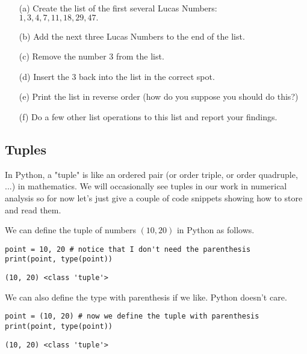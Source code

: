 \begin{problem}
    \begin{enumerate}
        \item[(a)] Create the list of the first several Lucas Numbers: \\
            $1,3,4,7,11,18,29,47.$
        \item[(b)] Add the next three Lucas Numbers to the end of the list.
        \item[(c)] Remove the number 3 from the list.
        \item[(d)] Insert the 3 back into the list in the correct spot.
        \item[(e)] Print the list in reverse order (how do you suppose you should do this?)
        \item[(f)] Do a few other list operations to this list and report your findings.
    \end{enumerate}
\end{problem}

\subsection{Tuples}
In Python, a "tuple" is like an ordered pair (or order triple, or order quadruple, ...) in
mathematics.  We will occasionally see tuples in our work in numerical analysis so for now
let's just give a couple of code snippets showing how to store and read them.

\begin{example}
    We can define the tuple of numbers $(10,20)$ in Python as follows.

    \bcode
\begin{lstlisting}
point = 10, 20 # notice that I don't need the parenthesis
print(point, type(point))
\end{lstlisting}
\boutput
\begin{lstlisting}
(10, 20) <class 'tuple'>
\end{lstlisting}

We can also define the type with parenthesis if we like.  Python doesn't care.

\bcode
\begin{lstlisting}
point = (10, 20) # now we define the tuple with parenthesis
print(point, type(point))
\end{lstlisting}
\boutput
\begin{lstlisting}
(10, 20) <class 'tuple'>
\end{lstlisting}
\end{example}



